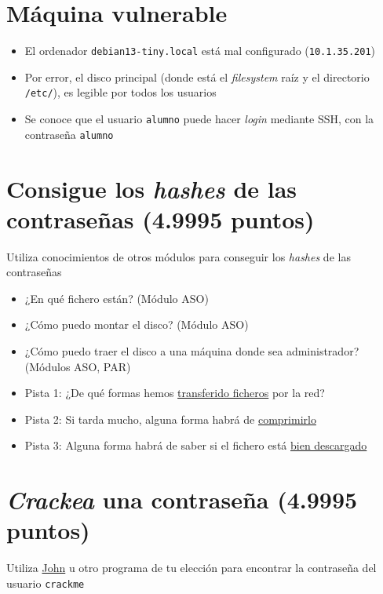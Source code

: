 \documentclass[a4paper]{article}
\begin{document}
\section*{Máquina vulnerable}
\label{sec:org0000003}
\begin{itemize}
\item El ordenador \texttt{debian13-tiny.local} está mal configurado (\texttt{10.1.35.201})
\item Por error, el disco principal (donde está el \emph{filesystem} raíz y el directorio \texttt{/etc/}), es legible por todos los usuarios
\item Se conoce que el usuario \texttt{alumno}  puede hacer \emph{login} mediante SSH, con la contraseña \texttt{alumno}
\end{itemize}
\section{Consigue los \emph{hashes} de las contraseñas (4.9995 puntos)}
\label{sec:org0000006}
Utiliza conocimientos de otros módulos para conseguir los \emph{hashes} de las contraseñas
\begin{itemize}
\item ¿En qué fichero están? (Módulo ASO)
\item ¿Cómo puedo montar el disco? (Módulo ASO)
\item ¿Cómo puedo traer el disco a una máquina donde sea administrador? (Módulos ASO, PAR)
\end{itemize}

\begin{Aviso}[Pista]
\begin{itemize}
\item Pista 1: ¿De qué formas hemos \href{https://alvarogonzalezsotillo.github.io/apuntes-clase/planificacion-administracion-redes-asir1/apuntes/5/par-5-tcp-udp.reveal.html}{transferido ficheros} por la red?
\item Pista 2: Si tarda mucho, alguna forma habrá de \href{https://www.baeldung.com/linux/compress-files-from-stdin}{comprimirlo}
\item Pista 3: Alguna forma habrá de saber si el fichero está \href{https://ftp.cica.es/debian-cd/current/amd64/iso-dvd/SHA256SUMS}{bien descargado}
\end{itemize}
\end{Aviso}
\section{\emph{Crackea} una contraseña (4.9995 puntos)}
\label{sec:org0000009}
Utiliza \href{https://www.openwall.com/john/}{John} u otro programa de tu elección para encontrar la contraseña del usuario \texttt{crackme}
\end{document}
